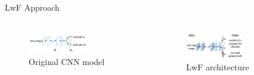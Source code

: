 \documentclass[aspectratio=169, xcolor=dvipsnames]{beamer}
\begin{document}
\begin{frame}{LwF Approach}
      \framesubtitle{}%
      
      \begin{columns}
      \begin{figure}[ht!]
            \centering
            \includegraphics[width=0.6\textwidth]{images/lwf_cnn_model}
            \caption{Original CNN model\footnotemark[11]}
      \end{figure}
      
      \begin{figure}[ht!]
            \centering
            \includegraphics[width=0.6\textwidth]{images/lwf_model}
            \caption{LwF architecture\footnotemark[11]}
      \end{figure} 
      

\end{columns}
\end{frame}
\end{document}
